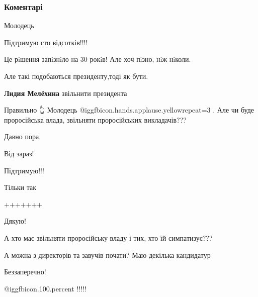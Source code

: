  
 
 
 
 
\subsubsection{Коментарі}
\label{sec:10_09_2021.fb.fb_group.ukrainska_mova_dlja_vsih.1.nardep_presledovanie_prepodavateli.cmt}

\begin{itemize} %
Молодець

Підтримую сто відсотків!!!!

Це рiшення запiзнiло на 30 рокiв! Але хоч пiзно, нiж нiколи.

Але такі подобаються президенту,тоді як бути.

\begin{itemize} %
\textbf{Лидия Мелёхина} звільнити президента
\end{itemize} %

Правильно 👆 Молодець  @igg{fbicon.hands.applause.yellow}{repeat=3} .
Але чи буде проросійська влада, звільняти проросійських викладачів???


Давно пора.

Від зараз!

Підтримую!!!

Тільки так

+++++++

Дякую!

А хто має звільняти проросійську владу і тих, хто їй симпатизує???

А можна з директорів та завучів почати? Маю декілька кандидатур

Беззаперечно!

 @igg{fbicon.100.percent} !!!!!


\end{itemize}
